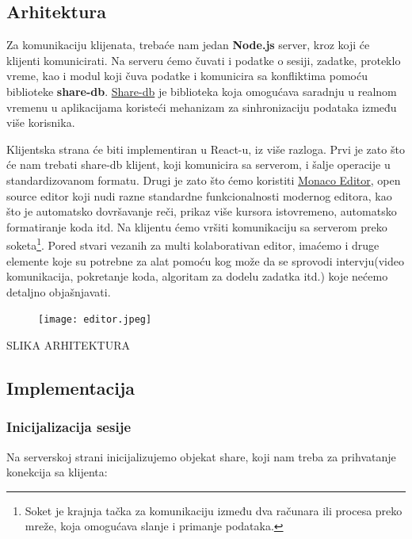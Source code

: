 \documentclass[12pt]{article}
\begin{document}
\subsection{Arhitektura}

Za komunikaciju klijenata, trebaće nam jedan \textbf{Node.js} server, kroz koji će klijenti komunicirati. Na serveru ćemo čuvati i podatke o sesiji, zadatke, proteklo vreme, kao i modul koji čuva podatke i komunicira sa konfliktima pomoću biblioteke \textbf{share-db}. \href{https://share.github.io/sharedb/}{Share-db} je biblioteka koja omogućava saradnju u realnom vremenu u aplikacijama koristeći mehanizam za sinhronizaciju podataka između više korisnika. \cite{sharedb}

Klijentska strana će biti implementiran u React-u, iz više razloga. Prvi je zato što će nam trebati share-db klijent, koji komunicira sa serverom, i šalje operacije u standardizovanom formatu. Drugi je zato što ćemo koristiti \href{https://microsoft.github.io/monaco-editor/}{Monaco Editor}, open source editor koji nudi razne standardne funkcionalnosti modernog editora, kao što je automatsko dovršavanje reči, prikaz više kursora istovremeno, automatsko formatiranje koda itd. Na klijentu ćemo vršiti komunikaciju sa serverom preko soketa\footnote{Soket je krajnja tačka za komunikaciju između dva računara ili procesa preko mreže, koja omogućava slanje i primanje podataka.}. Pored stvari vezanih za multi kolaborativan editor, imaćemo i druge elemente koje su potrebne za alat pomoću kog može da se sprovodi intervju(video komunikacija, pokretanje koda, algoritam za dodelu zadatka itd.) koje nećemo detaljno objašnjavati.

\begin{figure}[H]
	\centering
	\texttt{[image: editor.jpeg]}
	
\end{figure}
SLIKA ARHITEKTURA

\subsection{Implementacija}

\subsubsection{Inicijalizacija sesije}

Na serverskoj strani inicijalizujemo objekat share, koji nam treba za prihvatanje konekcija sa klijenta:
\end{document}
